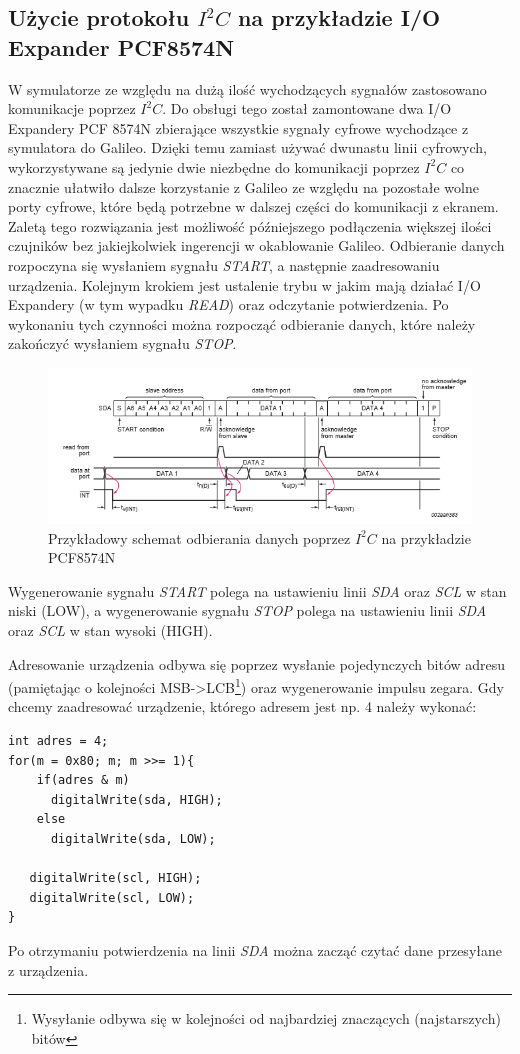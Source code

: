 \documentclass{xmgr}
\begin{document}
\subsection{Użycie protokołu $I^2C$ na przykładzie I/O Expander PCF8574N}
W symulatorze ze względu na dużą ilość wychodzących sygnałów zastosowano komunikacje poprzez $I^2C$. Do obsługi tego został zamontowane dwa I/O Expandery PCF 8574N zbierające wszystkie sygnały cyfrowe wychodzące z symulatora do Galileo. Dzięki temu zamiast używać dwunastu linii cyfrowych, wykorzystywane są jedynie dwie niezbędne do komunikacji poprzez $I^2C$ co znacznie ułatwiło dalsze korzystanie z Galileo ze względu na pozostałe wolne porty cyfrowe, które będą potrzebne w dalszej części do komunikacji z ekranem. Zaletą tego rozwiązania jest możliwość późniejszego podłączenia większej ilości czujników bez jakiejkolwiek ingerencji w okablowanie Galileo. Odbieranie danych rozpoczyna się wysłaniem sygnału \emph{START}, a następnie zaadresowaniu urządzenia. Kolejnym krokiem jest ustalenie trybu w jakim mają działać I/O Expandery (w tym wypadku \emph{READ}) oraz odczytanie potwierdzenia. Po wykonaniu tych czynności można rozpocząć odbieranie danych, które należy zakończyć wysłaniem sygnału \emph{STOP}.

\begin{figure}[!h]
    \centering
    \includegraphics[height=0.25\textheight]{images/read_i2c.png}
    \caption{Przykładowy schemat odbierania danych poprzez $I^2C$ na przykładzie PCF8574N\label{$I^2C$}}
\end{figure}

Wygenerowanie sygnału \emph{START} polega na ustawieniu linii \emph{SDA} oraz \emph{SCL} w stan niski (LOW), a wygenerowanie sygnału \emph{STOP} polega na ustawieniu linii \emph{SDA} oraz \emph{SCL} w stan wysoki (HIGH).

Adresowanie urządzenia odbywa się poprzez wysłanie pojedynczych bitów adresu (pamiętając o kolejności MSB->LCB\footnote{Wysyłanie odbywa się w kolejności od najbardziej znaczących (najstarszych) bitów}) oraz wygenerowanie impulsu zegara. Gdy chcemy zaadresować urządzenie, którego adresem jest np. 4 należy wykonać:
\begin{lstlisting}[label=bot-dirs-alg,caption=Adresowanie urządzenia $I^2C$ na przykładzie PCF8574N]
int adres = 4;
for(m = 0x80; m; m >>= 1){
    if(adres & m)         
      digitalWrite(sda, HIGH);
    else
      digitalWrite(sda, LOW);
        
   digitalWrite(scl, HIGH);
   digitalWrite(scl, LOW); 
}
\end{lstlisting}
Po otrzymaniu potwierdzenia na linii \emph{SDA} można zacząć czytać dane przesyłane z urządzenia.
\end{document}

